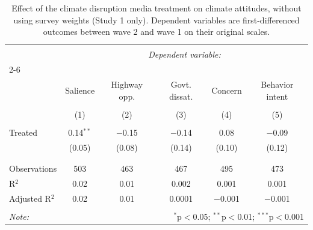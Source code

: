 
\begin{table}[!htbp] \centering 
  \caption{Effect of the climate disruption media treatment
          on climate attitudes, without using survey weights (Study 1 only). Dependent variables are first-differenced
          outcomes between wave 2 and wave 1 on their original scales.} 
  \label{} 
\begin{tabular}{@{\extracolsep{5pt}}lccccc} 
\\[-1.8ex]\hline 
\hline \\[-1.8ex] 
 & \multicolumn{5}{c}{\textit{Dependent variable:}} \\ 
\cline{2-6} 
\\[-1.8ex] & Salience & Highway opp. & Govt. dissat. & Concern & Behavior intent \\ 
\\[-1.8ex] & (1) & (2) & (3) & (4) & (5)\\ 
\hline \\[-1.8ex] 
 Treated & 0.14$^{**}$ & $-$0.15 & $-$0.14 & 0.08 & $-$0.09 \\ 
  & (0.05) & (0.08) & (0.14) & (0.10) & (0.12) \\ 
  & & & & & \\ 
\hline \\[-1.8ex] 
Observations & 503 & 463 & 467 & 495 & 473 \\ 
R$^{2}$ & 0.02 & 0.01 & 0.002 & 0.001 & 0.001 \\ 
Adjusted R$^{2}$ & 0.02 & 0.01 & 0.0001 & $-$0.001 & $-$0.001 \\ 
\hline 
\hline \\[-1.8ex] 
\textit{Note:}  & \multicolumn{5}{r}{$^{*}$p$<$0.05; $^{**}$p$<$0.01; $^{***}$p$<$0.001} \\ 
\end{tabular} 
\end{table} 

